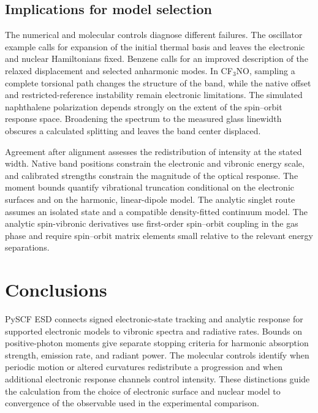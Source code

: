 \documentclass[11pt]{article}
\begin{document}
\subsection{Implications for model selection}

The numerical and molecular controls diagnose different failures. The oscillator example calls for expansion of the initial thermal basis and leaves the electronic and nuclear Hamiltonians fixed. Benzene calls for an improved description of the relaxed displacement and selected anharmonic modes. In CF$_3$NO, sampling a complete torsional path changes the structure of the band, while the native offset and restricted-reference instability remain electronic limitations. The simulated naphthalene polarization depends strongly on the extent of the spin--orbit response space. Broadening the spectrum to the measured glass linewidth obscures a calculated splitting and leaves the band center displaced.

Agreement after alignment assesses the redistribution of intensity at the stated width. Native band positions constrain the electronic and vibronic energy scale, and calibrated strengths constrain the magnitude of the optical response. The moment bounds quantify vibrational truncation conditional on the electronic surfaces and on the harmonic, linear-dipole model. The analytic singlet route assumes an isolated state and a compatible density-fitted continuum model. The analytic spin-vibronic derivatives use first-order spin--orbit coupling in the gas phase and require spin--orbit matrix elements small relative to the relevant energy separations.

\FloatBarrier
\section{Conclusions}

PySCF ESD connects signed electronic-state tracking and analytic response for supported electronic models to vibronic spectra and radiative rates. Bounds on positive-photon moments give separate stopping criteria for harmonic absorption strength, emission rate, and radiant power. The molecular controls identify when periodic motion or altered curvatures redistribute a progression and when additional electronic response channels control intensity. These distinctions guide the calculation from the choice of electronic surface and nuclear model to convergence of the observable used in the experimental comparison.

\end{document}
